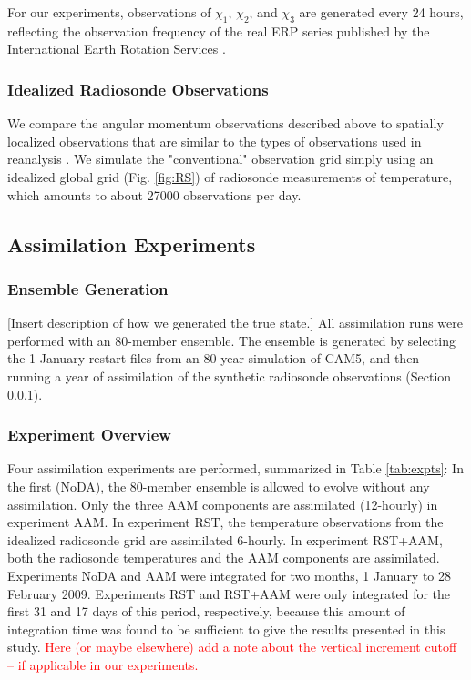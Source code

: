 For our experiments, observations of $\chi_1$, $\chi_2$, and $\chi_3$ are generated every 24 hours, reflecting the observation frequency of the real ERP series published by the International Earth Rotation Services \citep{iers}.  


\subsubsection{Idealized Radiosonde Observations}
\label{sec:radiosondes}

We compare the angular momentum observations described above to spatially localized observations that are similar to the types of observations used in  reanalysis \citep{Dee2005}.
We simulate the "conventional" observation grid simply using an idealized global grid (Fig. \ref{fig:RS}) of radiosonde measurements of temperature, which amounts to about 27000 observations per day.  





\subsection{Assimilation Experiments}
\label{sec:experiments}


\subsubsection{Ensemble Generation}

\textcolor{alert}{[Insert description of how we generated the true state.]}
All assimilation runs were performed with an 80-member ensemble.
The ensemble is generated by selecting the 1 January restart files from an 80-year simulation of CAM5, and then running a year of assimilation of the synthetic radiosonde observations (Section \ref{sec:radiosondes}).

\subsubsection{Experiment Overview}
Four assimilation experiments are performed, summarized in Table \ref{tab:expts}: In the first (NoDA), the 80-member ensemble is allowed to evolve without any assimilation. 
Only the three  AAM components are assimilated (12-hourly) in experiment AAM.  
In experiment RST, the temperature observations from the idealized radiosonde grid are assimilated 6-hourly.
In experiment RST+AAM, both the radiosonde temperatures and the AAM components are assimilated. 
Experiments NoDA and AAM were integrated for two months, 1 January to 28 February 2009.  
Experiments RST and RST+AAM were only integrated for the first 31 and 17 days of this period, respectively, because this amount of integration time was found to be sufficient to give the results presented in this study.
\textcolor{red}{Here (or maybe elsewhere) add a note about the vertical increment cutoff -- if applicable in our experiments.}


